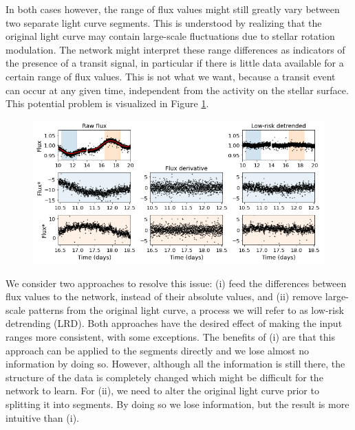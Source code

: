 In both cases however, the range of flux values might still greatly vary between two separate light curve segments. This is understood by realizing that the original light curve may contain large-scale fluctuations due to stellar rotation modulation. The network might interpret these range differences as indicators of the presence of a transit signal, in particular if there is little data available for a certain range of flux values. This is not what we want, because a transit event can occur at any given time, independent from the activity on the stellar surface. This potential problem is visualized in Figure \ref{fig:preprocessing-ranges}.

\begin{figure}
    \centering
    \includegraphics[width=0.8\linewidth]{Experiments/Figures/Preprocessing/prepocessing_ranges_example.png}
    \caption{}
    \label{fig:preprocessing-ranges}
\end{figure}

We consider two approaches to resolve this issue: (i) feed the differences between flux values to the network, instead of their absolute values, and (ii) remove large-scale patterns from the original light curve, a process we will refer to as low-risk detrending (LRD). Both approaches have the desired effect of making the input ranges more consistent, with some exceptions. The benefits of (i) are that this approach can be applied to the segments directly and we lose almost no information by doing so. However, although all the information is still there, the structure of the data is completely changed which might be difficult for the network to learn. For (ii), we need to alter the original light curve prior to splitting it into segments. By doing so we lose information, but the result is more intuitive than (i).

